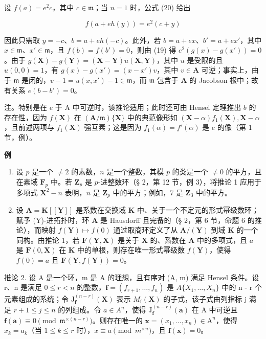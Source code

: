 设 \(f(a) = e^{2}c\)，其中 \(c \in \mathfrak{m}\)；当 \(n = 1\) 时，公式 (20) 给出

\[
f (a + e h (y)) = e ^ {2} (c + y)
\]

因此只需取 \(y = -c\)、\(b = a + eh(-c)\)。此外，若 \(b = a + ex\)、\(b' = a + ex'\)，其中 \(x \in \mathfrak{m}\)、\(x' \in \mathfrak{m}\)，且 \(f(b) = f(b') = 0\)，则由 (19) 得 \(e^2(g(x) - g(x')) = 0\)。由于 \(g(\mathbf{X}) - g(\mathbf{Y}) = (\mathbf{X} - \mathbf{Y})u(\mathbf{X}, \mathbf{Y})\)，其中 \(u\) 是受限的且 \(u(0,0) = 1\)，有 \(g(x) - g(x') = (x - x')v\)，其中 \(v \in \mathbf{A}\) 可逆；事实上，由于 \(\mathfrak{m}\) 是闭的，\(v - 1 = u(x,x') - 1 \in \mathfrak{m}\)，而 \(\mathfrak{m}\) 包含于 \(\mathbf{A}\) 的 Jacobson 根中；故有关系 \(e(b - b') = 0\)。

注。特别是在 \(e\) 于 A 中可逆时，该推论适用；此时还可由 Hensel 定理推出 \(b\) 的存在性，因为 \(f(\mathbf{X})\) 在 \((\mathbf{A} / \mathfrak{m})\{\mathbf{X}\}\) 中的典范像形如 \((\mathbf{X} - \alpha)f_1(\mathbf{X}), \mathbf{X} - \alpha\)，且前述两项与 \(f_1(\mathbf{X})\) 强互素；这是因为 \(f_1(\alpha) = f'(\alpha)\) 是 \(e\) 的像（第 1 节，例）。

\textbf{例}\par

\begin{enumerate}
\def\labelenumi{(\arabic{enumi})}
\item
 设 \(p\) 是一个 \(\neq 2\) 的素数，\(n\) 是一个整数，其模 \(p\) 的类是一个 \(\neq 0\) 的平方，且在素域 \(\mathbf{F}_p\) 中。若 \(\mathbf{Z}_p\) 是 \(p\)-进整数环（§ 2，第 12 节，例 3），将推论 1 应用于多项式 \(\mathbf{X}^2 - n\) 表明，\(n\) 是 \(\mathbf{Z}_p\) 中的平方；例如，7 是 \(\mathbf{Z}_3\) 中的平方。
\item
  设 \(\mathbf{A} = \mathbf{K}[[\mathbf{Y}]]\) 是系数在交换域 \(\mathbf{K}\) 中、关于一个不定元的形式幂级数环；赋予 (Y)-进拓扑时，环 \(\mathbf{A}\) 是 Hausdorff 且完备的（§ 2，第 6 节，命题 6 的推论），而映射 \(f(\mathbf{Y}) \mapsto f(0)\) 通过取商环定义了从 \(\mathbf{A}/(\mathbf{Y})\) 到域 \(\mathbf{K}\) 的一个同构。由推论 1，若 \(\mathbf{F}(\mathbf{Y}, \mathbf{X})\) 是关于 \(\mathbf{X}\) 的、系数在 \(\mathbf{A}\) 中的多项式，且 \(a\) 是 \(\mathbf{F}(0, \mathbf{X})\) 在 \(\mathbf{K}\) 中的单根，则存在唯一形式幂级数 \(f(\mathbf{Y})\)，使得 \(f(0) = a\) 且 \(\mathbf{F}(\mathbf{Y}, f(\mathbf{Y})) = 0\)。
\end{enumerate}

推论 2. 设 A 是一个环，m 是 A 的理想，且有序对 (A, m) 满足 Hensel 条件。设 r、n 是满足 \(0 \leqslant r < n\) 的整数，\(\mathbf{f} = (f_{r+1}, \ldots, f_n)\) 是 \(A\{X_1, \ldots, X_n\}\) 中的 n - r 个元素组成的系统；令 \(\mathrm{J}_{\mathbf{f}}^{(n-r)}(\mathbf{X})\) 表示 \(M_{\mathbf{f}}(\mathbf{X})\) 的子式，该子式由列指标 j 满足 \(r + 1 \leqslant j \leqslant n\) 的列组成。令 \(a \in A^n\)，使得 \(\mathrm{J}_{\mathbf{f}}^{(n-r)}(\mathbf{a})\) 在 A 中可逆且 \(\mathbf{f}(\mathbf{a}) \equiv 0 \pmod{\mathfrak{m}^{\times(n-r)}}\)。则存在唯一的 \(\mathbf{x} = (x_1, \ldots, x_n) \in \mathrm{A}^n\)，使得 \(x_k = a_k\)（当 \(1 \leqslant k \leqslant r\) 时），\(x \equiv a \pmod{m^{\times n}}\)，且 \(\mathbf{f}(\mathbf{x}) = 0\)。

